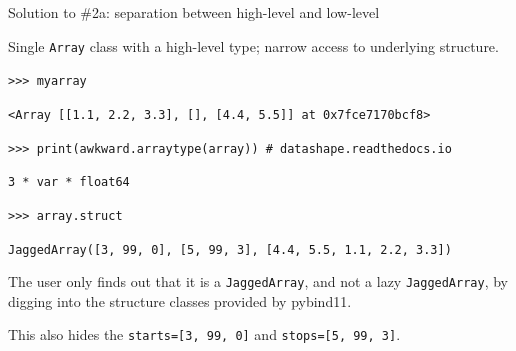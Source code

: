 \documentclass[aspectratio=169]{beamer}
\begin{document}
\begin{frame}[fragile]{Solution to \#2a: separation between high-level and low-level}
\large
\vspace{0.5 cm}

Single {\tt Array} class with a high-level type; narrow access to underlying structure.

\small
\vspace{0.2 cm}
\texttt{>>> myarray}

\vspace{0.1 cm}
{\tt <Array [[1.1, 2.2, 3.3], [], [4.4, 5.5]] at 0x7fce7170bcf8>}

\vspace{0.2 cm}
\texttt{>>> print(awkward.arraytype(array))   # datashape.readthedocs.io}

\vspace{0.1 cm}
{\tt 3 * var * float64}

\vspace{0.2 cm}
\texttt{>>> array.struct}

\vspace{0.1 cm}
{\tt JaggedArray([3, 99, 0], [5, 99, 3], [4.4, 5.5, 1.1, 2.2, 3.3])}

\large
\vspace{0.3 cm}
The user only finds out that it is a {\tt JaggedArray}, and not a lazy {\tt JaggedArray}, by digging into the structure classes provided by pybind11.

\vspace{0.3 cm}
This also hides the \texttt{starts=[3, 99, 0]} and \texttt{stops=[5, 99, 3]}.
\end{frame}
\end{document}
